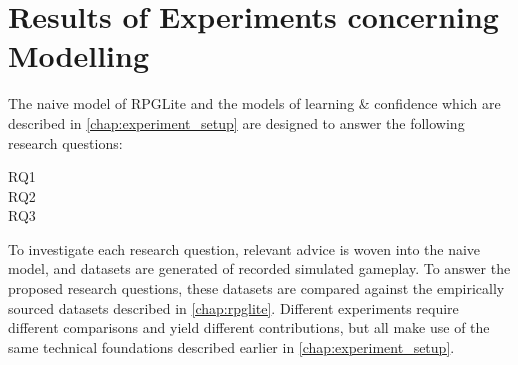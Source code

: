 \chapter{Results of Experiments concerning \AspectOriented Modelling}
\label{chap:exp2_old_aspects_new_systems}
\label{chap:experimental_results}
\label{sec:optimisation_with_aspects_experimental_results}



The naive model of RPGLite and the \aspectoriented models of learning \&
confidence which are described in \cref{chap:experiment_setup} are designed to
answer the following research questions:

\begin{researchquestion}
  \begin{description}
\item[RQ1] \rqtwo{}
\item[RQ2] \rqthree{}
\item[RQ3] \rqfour{}
  \end{description}
\end{researchquestion}


To investigate each research question, relevant advice is woven into the naive
model, and datasets are generated of recorded simulated gameplay. To answer the
proposed research questions, these datasets are compared against the empirically
sourced datasets described in \cref{chap:rpglite}. Different experiments require
different comparisons and yield different contributions, but all make use of the
same technical foundations described earlier in \cref{chap:experiment_setup}.

